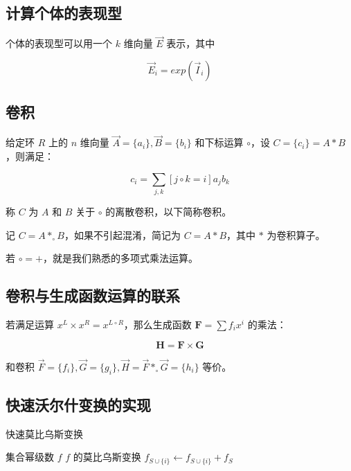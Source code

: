 \documentclass{article}
\begin{document}
	\subsection{计算个体的表现型}

	个体的表现型可以用一个 $k$ 维向量 $\vec E$ 表示，其中

	$$\vec E_i=exp(\vec I_i)$$

	\subsection{卷积}

	给定环 $R$ 上的 $n$ 维向量 $\vec A=\{a_i\},\vec B=\{b_i\}$ 和下标运算 $\circ$，设 $C=\{c_i\}=A*B$，则满足：

	$$c_i=\sum_{j,k} [j \circ k=i] a_jb_k$$

	称 $C$ 为 $A$ 和 $B$ 关于 $\circ$ 的离散卷积，以下简称卷积。

	记 $C=A*_{\circ}B$，如果不引起混淆，简记为 $C=A*B$，其中 $*$ 为卷积算子。

	若 $\circ = +$，就是我们熟悉的多项式乘法运算。

	\subsection{卷积与生成函数运算的联系}

	若满足运算 $x^L \times x^R = x^{L \circ R}$，那么生成函数 $\mathbf{F}=\sum f_i x^i$ 的乘法：

	$$\textbf{H}=\textbf{F} \times \textbf{G}$$

	和卷积 $\vec F=\{f_i\},\vec G=\{g_i\},\vec H=\vec F *_{\circ} \vec G=\{h_i\}$ 等价。

	\subsection{快速沃尔什变换的实现}

	\begin{algorithm}
        \caption{快速莫比乌斯变换}
        \begin{algorithmic}[1]
            \Require 集合幂级数 $f$
            \Ensure $f$ 的莫比乌斯变换
						\State $f_{S \cup \{i\}} \gets f_{S \cup \{i\}} + f_{S}$
					\EndFor
				\EndFor
                \State {}
            \EndFunction
		\end{algorithmic}
	\end{algorithm}
\end{document}
